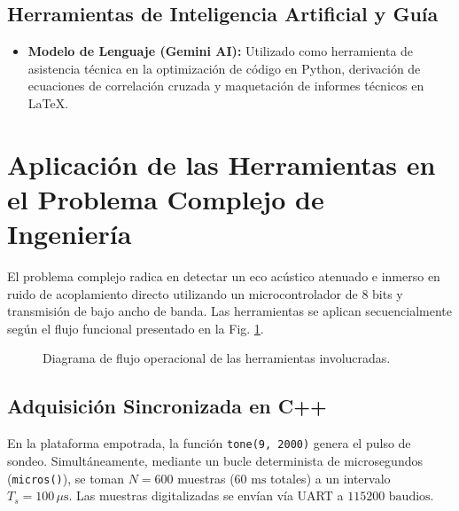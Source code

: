 \documentclass[conference]{IEEEtran}
\begin{document}
\subsection{Herramientas de Inteligencia Artificial y Guía}
\begin{itemize}
    \item \textbf{Modelo de Lenguaje (Gemini AI):} Utilizado como herramienta de asistencia técnica en la optimización de código en Python, derivación de ecuaciones de correlación cruzada y maquetación de informes técnicos en LaTeX.
\end{itemize}

\section{Aplicación de las Herramientas en el Problema Complejo de Ingeniería}
El problema complejo radica en detectar un eco acústico atenuado e inmerso en ruido de acoplamiento directo utilizando un microcontrolador de 8 bits y transmisión de bajo ancho de banda. Las herramientas se aplican secuencialmente según el flujo funcional presentado en la Fig. \ref{fig:flujo}.

\begin{figure}[htbp]
\centering
{}
\caption{Diagrama de flujo operacional de las herramientas involucradas.}
\label{fig:flujo}
\end{figure}

\subsection{Adquisición Sincronizada en C++}
En la plataforma empotrada, la función \texttt{tone(9, 2000)} genera el pulso de sondeo. Simultáneamente, mediante un bucle determinista de microsegundos (\texttt{micros()}), se toman $N = 600$ muestras ($60\text{ ms}$ totales) a un intervalo $T_s = 100\,\mu\text{s}$. Las muestras digitalizadas se envían vía UART a $115200\text{ baudios}$.
\end{document}
